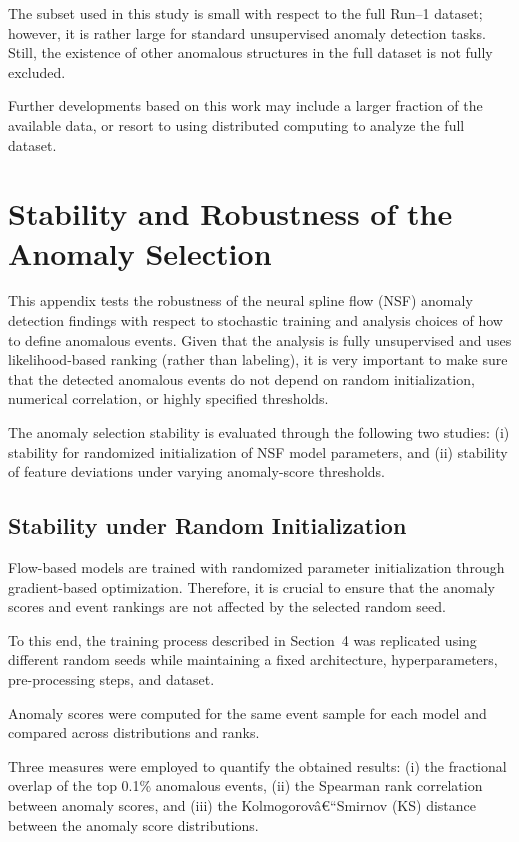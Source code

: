 \documentclass[11pt,a4paper,twocolumn]{article}
\begin{document}
The subset used in this study is small with respect to the full Run--1 dataset; however, it is rather large for standard unsupervised anomaly detection tasks.
Still, the existence of other anomalous structures in the full dataset is not fully excluded.

Further developments based on this work may include a larger fraction of the available data, or resort to using distributed computing to analyze the full dataset.
\section{Stability and Robustness of the Anomaly Selection}
\label{app:stability}

This appendix tests the robustness of the neural spline flow (NSF) anomaly detection findings with respect to stochastic training and analysis choices of how to define anomalous events.
Given that the analysis is fully unsupervised and uses likelihood-based ranking (rather than labeling), it is very important to make sure that the detected anomalous events do not depend on random initialization, numerical correlation, or highly specified thresholds.

The anomaly selection stability is evaluated through the following two studies: 
(i) stability for randomized initialization of NSF model parameters, and 
(ii) stability of feature deviations under varying anomaly-score thresholds. 

\subsection{Stability under Random Initialization}
\label{app:seed_stability}

Flow-based models are trained with randomized parameter initialization through gradient-based optimization. 
Therefore, it is crucial to ensure that the anomaly scores and event rankings are not affected by the selected random seed.

To this end, the training process described in Section~4 was replicated using different random seeds while maintaining a fixed architecture, hyperparameters, pre-processing steps, and dataset.

Anomaly scores were computed for the same event sample for each model and compared across distributions and ranks.

Three measures were employed to quantify the obtained results:
(i) the fractional overlap of the top 0.1\% anomalous events,
(ii) the Spearman rank correlation between anomaly scores, and
(iii) the Kolmogorovâ€“Smirnov (KS) distance between the anomaly score distributions.
\end{document}
